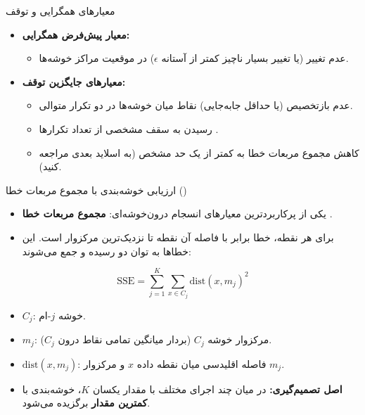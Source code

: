 \begin{frame}{معیارهای همگرایی و توقف}{}
  \begin{itemize}
    \setlength{\itemsep}{6pt}
    \item \textbf{معیار پیش‌فرض همگرایی:}
    \begin{itemize}
      \item عدم تغییر (یا تغییر بسیار ناچیز کمتر از آستانه $\epsilon$) در موقعیت مراکز خوشه‌ها.
    \end{itemize}
    \item \textbf{معیارهای جایگزین توقف:}
    \begin{itemize}
      \setlength{\itemsep}{3pt}
      \item عدم بازتخصیص (یا حداقل جابه‌جایی) نقاط میان خوشه‌ها در دو تکرار متوالی.
      \item رسیدن به سقف مشخصی از تعداد تکرارها .
      \item کاهش مجموع مربعات خطا  به کمتر از یک حد مشخص (به اسلاید بعدی مراجعه کنید).
    \end{itemize}
  \end{itemize}
\end{frame}

\begin{frame}{ارزیابی خوشه‌بندی با مجموع مربعات خطا ()}{}
  \begin{itemize}
    \setlength{\itemsep}{4pt}
    \item یکی از پرکاربردترین معیارهای انسجام درون‌خوشه‌ای: \textbf{مجموع مربعات خطا }.
    \item برای هر نقطه، خطا برابر با فاصله آن نقطه تا نزدیک‌ترین مرکزوار است. این خطاها به توان دو رسیده و جمع می‌شوند:
  \end{itemize}
  \[
    \text{SSE} = \sum_{j=1}^{K} \sum_{x \in C_j} \text{dist}(x, m_j)^2
  \]
  \begin{itemize}
    \setlength{\itemsep}{3pt}
    \item $C_j$: خوشه $j$-ام.
    \item $m_j$: مرکزوار خوشه $C_j$ (بردار میانگین تمامی نقاط درون $C_j$).
    \item $\text{dist}(x, m_j)$: فاصله اقلیدسی میان نقطه داده $x$ و مرکزوار $m_j$.
    \item \textbf{اصل تصمیم‌گیری:} در میان چند اجرای مختلف با مقدار یکسان $K$، خوشه‌بندی با \textbf{کمترین مقدار } برگزیده می‌شود.
  \end{itemize}
\end{frame}

